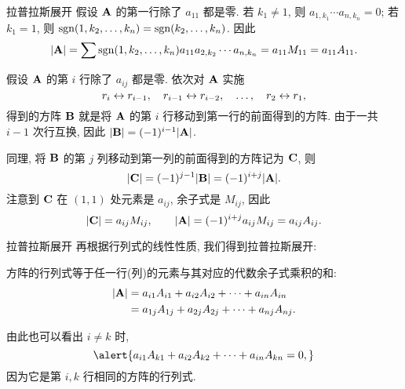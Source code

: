 \begin{frame}{拉普拉斯展开}
	\onslide<+->
	假设 ${\mathbf{A}}$ 的第一行除了 $a_{11}$ 都是零.
	\onslide<+->
	若 $k_1\neq 1$, 则 $a_{1,k_1}\cdots a_{n,k_n}=0$; 若 $k_1=1$, 则 $\operatorname{sgn}(1,k_2,\dots,k_n)=\operatorname{sgn}(k_2,\dots,k_n)$.
	\onslide<+->
	因此
	\[|{\mathbf{A}}|=\sum \operatorname{sgn}(1,k_2,\dots,k_n)a_{11}a_{2,k_2}\cdots a_{n,k_n}=a_{11} M_{11}=a_{11} A_{11}.\]

	\onslide<+->
	假设 ${\mathbf{A}}$ 的第 $i$ 行除了 $a_{ij}$ 都是零.
	\onslide<+->
	依次对 ${\mathbf{A}}$ 实施
	\[r_i\leftrightarrow r_{i-1},\quad r_{i-1}\leftrightarrow r_{i-2},\quad\dots,\quad r_2\leftrightarrow r_1,\]
	得到的方阵 ${\mathbf{B}}$ 就是将 ${\mathbf{A}}$ 的第 $i$ 行移动到第一行的前面得到的方阵.
	\onslide<+->
	由于一共 $i-1$ 次行互换, 因此 $|{\mathbf{B}}|=(-1)^{i-1}|{\mathbf{A}}|$.

	\onslide<+->
	同理, 将 ${\mathbf{B}}$ 的第 $j$ 列移动到第一列的前面得到的方阵记为 ${\mathbf{C}}$, 则
	\[|{\mathbf{C}}|=(-1)^{j-1}|{\mathbf{B}}|=(-1)^{i+j}|{\mathbf{A}}|.\]
	\onslide<+->
	注意到 ${\mathbf{C}}$ 在 $(1,1)$ 处元素是 $a_{ij}$, 余子式是 $M_{ij}$,
	\onslide<+->
	因此
	\[|{\mathbf{C}}|=a_{ij}M_{ij},\qquad |{\mathbf{A}}|=(-1)^{i+j}a_{ij}M_{ij}=a_{ij}A_{ij}.\]
\end{frame}


\begin{frame}{拉普拉斯展开}
	\onslide<+->
	再根据行列式的线性性质, 我们得到拉普拉斯展开:
	\begin{theorem}[行列式沿任一行(列)展开]
		方阵的行列式等于任一行(列)的元素与其对应的代数余子式乘积的和:
		\begin{align*}
			|{\mathbf{A}}|&=a_{i1}A_{i1}+a_{i2}A_{i2}+\cdots+a_{in}A_{in}\\
			&=a_{1j}A_{1j}+a_{2j}A_{2j}+\cdots+a_{nj}A_{nj}.
		\end{align*}
	\end{theorem}

	\onslide<+->
	由此也可以看出 \alert{$i\neq k$ 时,}
	\[\alert{a_{i1}A_{k1}+a_{i2}A_{k2}+\cdots+a_{in}A_{kn}=0,}\]
	\onslide<+->
	因为它是第 $i,k$ 行相同的方阵的行列式.
\end{frame}


